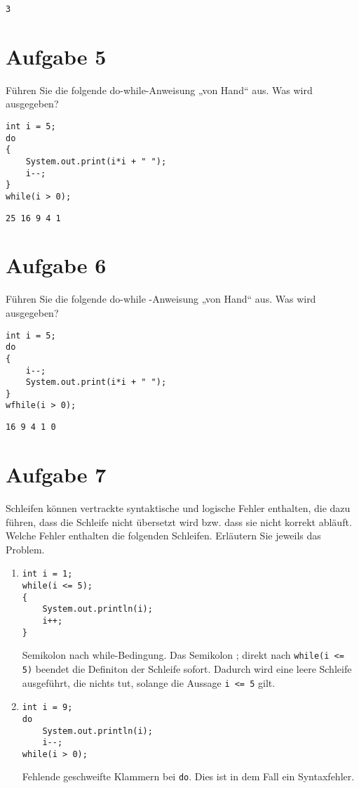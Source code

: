 \documentclass[10pt, oneside]{article}
\begin{document}
\verb|3|

\section{Aufgabe 5}

Führen Sie die folgende do-while-Anweisung „von Hand“ aus. Was wird
ausgegeben?

\begin{verbatim}
int i = 5;
do
{
    System.out.print(i*i + " ");
    i--;
}
while(i > 0);
\end{verbatim}

\verb|25 16 9 4 1|

\section{Aufgabe 6}

Führen Sie die folgende do-while -Anweisung „von Hand“ aus. Was wird
ausgegeben?

\begin{verbatim}
int i = 5;
do
{
    i--;
    System.out.print(i*i + " ");
}
wfhile(i > 0);
\end{verbatim}

\verb|16 9 4 1 0|

\pagebreak
\section{Aufgabe 7}

Schleifen können vertrackte syntaktische und logische Fehler enthalten, die dazu
führen, dass die Schleife nicht übersetzt wird bzw. dass sie nicht korrekt abläuft.
Welche Fehler enthalten die folgenden Schleifen. Erläutern Sie jeweils das Problem.

\begin{enumerate}
\item
\begin{verbatim}
int i = 1;
while(i <= 5);
{
    System.out.println(i);
    i++;
}
\end{verbatim}
Semikolon nach while-Bedingung. Das Semikolon ; direkt nach \verb|while(i <= 5)|
beendet die Definiton der Schleife sofort. Dadurch wird eine leere Schleife
ausgeführt, die nichts tut, solange die Aussage \verb|i <= 5| gilt.

\item
\begin{verbatim}
int i = 9;
do
    System.out.println(i);
    i--;
while(i > 0);
\end{verbatim}
Fehlende geschweifte Klammern bei \verb|do|. Dies ist in dem Fall ein
Syntaxfehler.
\end{enumerate}
\end{document}
